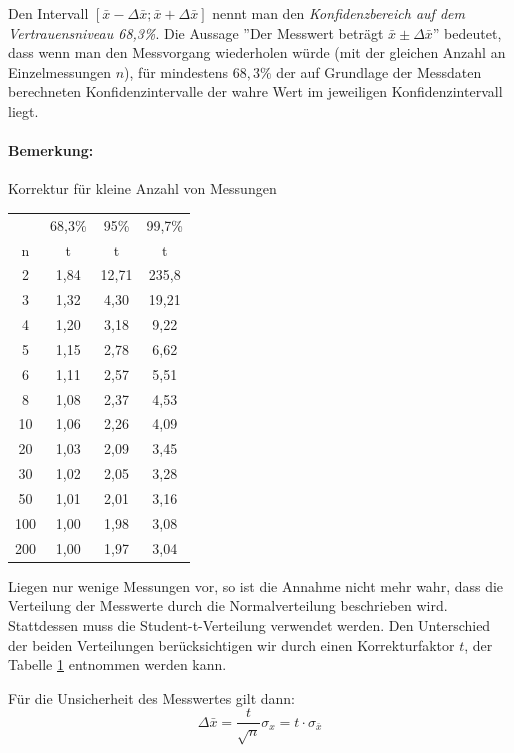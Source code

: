 Den Intervall $\left[\bar{x}-\Delta\bar{x}; \bar{x}+\Delta\bar{x}\right]$ nennt man den \textit{Konfidenzbereich auf dem Vertrauensniveau 68,3\%}. Die Aussage ''Der Messwert beträgt $\bar{x}\pm\Delta\bar{x}$'' bedeutet, dass wenn man den Messvorgang wiederholen würde (mit der gleichen Anzahl an Einzelmessungen $n$), für mindestens $68,3\%$ der auf Grundlage der Messdaten berechneten Konfidenzintervalle der wahre Wert im jeweiligen Konfidenzintervall liegt.

\paragraph{Bemerkung:} Korrektur für kleine Anzahl von Messungen

\begin{table}[t]	
	\centering
		\begin{tabular}[t]{|c|c|c|c|} 
			 & 68,3\% & 95\% & 99,7\% \\ 
			n & t & t & t \\\hline
			2 & 1,84 & 12,71 & 235,8 \\
			3 & 1,32 & 4,30 & 19,21 \\
			4 & 1,20 & 3,18 & 9,22 \\
			5 & 1,15 & 2,78 & 6,62 \\
			6 & 1,11 & 2,57 & 5,51 \\
			8 & 1,08 & 2,37 & 4,53 \\
			10 & 1,06 & 2,26 & 4,09 \\
			20 & 1,03 & 2,09 & 3,45 \\
			30 & 1,02 & 2,05 & 3,28 \\
			50 & 1,01 & 2,01 & 3,16 \\
			100 & 1,00 & 1,98 & 3,08 \\
			200 & 1,00 & 1,97 & 3,04 
		\end{tabular}
	\label{tab:Student-t}
\end{table}

\noindent
Liegen nur wenige Messungen vor, so ist die Annahme nicht mehr wahr, dass die Verteilung der Messwerte durch die Normalverteilung beschrieben wird. Stattdessen muss die Student-t-Verteilung verwendet werden. Den Unterschied der beiden Verteilungen berücksichtigen wir durch einen Korrekturfaktor $t$, der Tabelle \ref{tab:Student-t} entnommen werden kann.

\noindent
Für die Unsicherheit des Messwertes gilt dann:
\begin{equation}
 \Delta \bar{x} = \frac{t}{\sqrt{n}}\sigma_x = t\cdot \sigma_{\bar{x}}
\end{equation}

